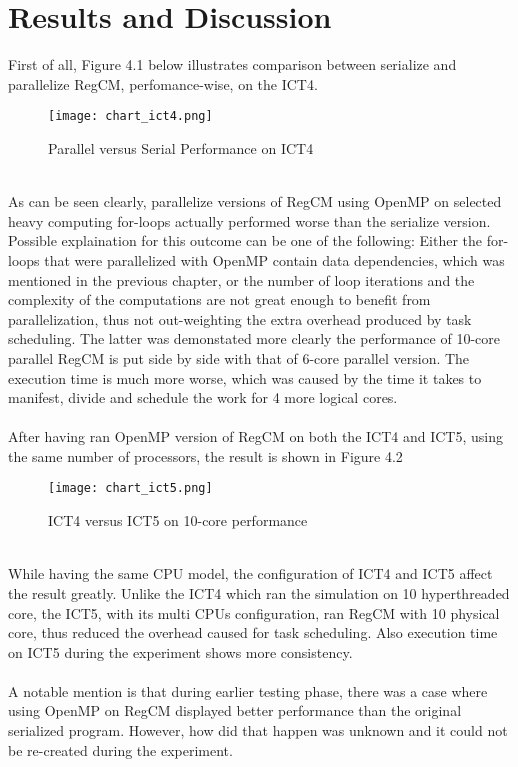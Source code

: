 \section{Results and Discussion}

First of all, Figure 4.1 below illustrates comparison between serialize and parallelize RegCM, perfomance-wise, on the ICT4. \\
\begin{figure}[H]
\texttt{[image: chart\_ict4.png]}
\centering
\caption{Parallel versus Serial Performance on ICT4}
\end{figure}
~\\
As can be seen clearly, parallelize versions of RegCM using OpenMP on selected heavy computing for-loops actually performed worse than the serialize version. Possible explaination for this outcome can be one of the following: Either the for-loops that were parallelized with OpenMP contain data dependencies, which was mentioned in the previous chapter, or the number of loop iterations and the complexity of the computations are not great enough to benefit from parallelization, thus not out-weighting the extra overhead produced by task scheduling. The latter was demonstated more clearly the performance of 10-core parallel RegCM is put side by side with that of 6-core parallel version. The execution time is much more worse, which was caused by the time it takes to manifest, divide and schedule the work for 4 more logical cores. \\
~\\
After having ran OpenMP version of RegCM on both the ICT4 and ICT5, using the same number of processors, the result is shown in Figure 4.2
\begin{figure}[H]
\texttt{[image: chart\_ict5.png]}
\centering
\caption{ICT4 versus ICT5 on 10-core performance}
\end{figure}
~\\
While having the same CPU model, the configuration of ICT4 and ICT5 affect the result greatly. Unlike the ICT4 which ran the simulation on 10 hyperthreaded core, the ICT5, with its multi CPUs configuration, ran RegCM with 10 physical core, thus reduced the overhead caused for task scheduling. Also execution time on ICT5 during the experiment shows more consistency. \\
~\\
A notable mention is that during earlier testing phase, there was a case where using OpenMP on RegCM displayed better performance than the original serialized program. However, how did that happen was unknown and it could not be re-created during the experiment.
